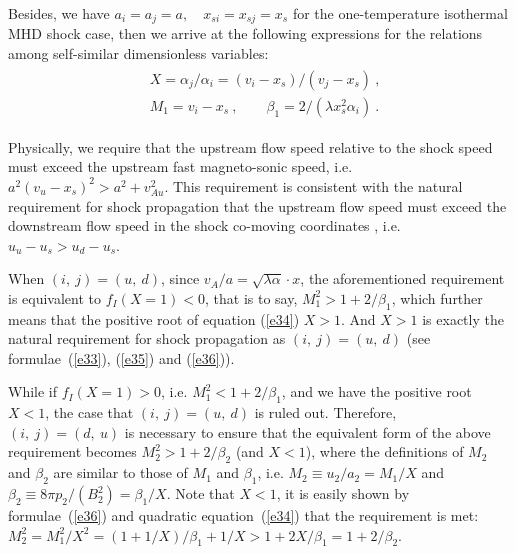 \documentclass[fleqn,usenatbib]{mnras}
\begin{document}
Besides, we have $a_{i}=a_{j}=a, \quad x_{si}=x_{sj}=x_{s}$ for the one-temperature isothermal MHD shock case, then we arrive at the following expressions for the relations among self-similar dimensionless variables:
\begin{gather}
\begin{split}
&X=\alpha_{j}/\alpha_{i}=(v_{i}-x_{s})/(v_{j}-x_{s})\ ,\\
&M_{1}=v_{i}-x_{s}\ , \qquad \beta_{1}
 =2/(\lambda x^{2}_{s}\alpha_{i})\ .
\end{split}\label{e36}
\end{gather}

Physically, we require that the upstream flow speed relative to the shock speed must exceed the upstream fast magneto-sonic speed, i.e. $a^{2}(v_{u}-x_{s})^{2}>a^{2}+v^{2}_{Au}$. This requirement is consistent with the natural requirement for shock propagation that the upstream flow speed must exceed the downstream flow speed in the shock co-moving coordinates \citep{FM}, i.e. $u_{u}-u_{s}>u_{d}-u_{s}$.


When $(i,\ j)=(u,\ d)$, since $v_{A}/a=\sqrt{\lambda\alpha}\cdot x$, the aforementioned requirement is equivalent to $f_{I}(X=1)<0$, that is to say, $M_{1}^{2}>1+2/\beta_{1}$, which further means that the positive root of equation (\ref{e34}) $X>1$. And $X>1$ is exactly the natural requirement for shock propagation as $(i,\ j)=(u,\ d)$ (see formulae~(\ref{e33}), (\ref{e35}) and (\ref{e36})).

While if $f_{I}(X=1)>0$, i.e. $M_{1}^{2}<1+2/\beta_{1}$, and we have the positive root $X<1$, the case that $(i,\ j)=(u,\ d)$ is ruled out. Therefore, $(i,\ j)=(d,\ u)$ is necessary to ensure that the equivalent form of the above requirement becomes $M_{2}^{2}>1+2/\beta_{2}$ (and $X<1$), where the definitions of $M_{2}$ and $\beta_{2}$ are similar to those of $M_{1}$ and $\beta_{1}$, i.e. $M_{2}\equiv u_{2}/a_{2}=M_{1}/X$ and $\beta_{2}\equiv 8\pi p_{2}/\left(B_{2}^{2}\right)=\beta_{1}/X$. Note that $X<1$, it is easily shown by formulae~(\ref{e36}) and quadratic equation~(\ref{e34}) that the requirement is met: $M_{2}^{2}=M^{2}_{1}/X^{2}=(1+1/X)/\beta_{1}+1/X>1+2X/\beta_{1}=1+2/\beta_{2}$.


\end{document}
